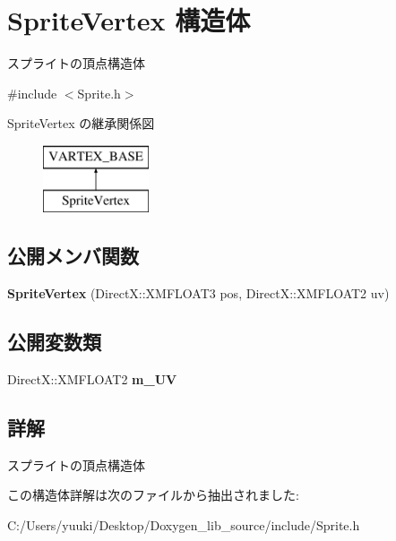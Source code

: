 \hypertarget{struct_d3_d11_1_1_graphic_1_1_sprite_vertex}{}\section{Sprite\+Vertex 構造体}
\label{struct_d3_d11_1_1_graphic_1_1_sprite_vertex}


スプライトの頂点構造体  




{\ttfamily \#include $<$Sprite.\+h$>$}

Sprite\+Vertex の継承関係図\begin{figure}[H]
\begin{center}
\leavevmode
\includegraphics[height=2.000000cm]{struct_d3_d11_1_1_graphic_1_1_sprite_vertex}
\end{center}
\end{figure}
\subsection*{公開メンバ関数}
\begin{DoxyCompactItemize}
\item 
{\bfseries Sprite\+Vertex} (Direct\+X\+::\+X\+M\+F\+L\+O\+A\+T3 pos, Direct\+X\+::\+X\+M\+F\+L\+O\+A\+T2 uv)\hypertarget{struct_d3_d11_1_1_graphic_1_1_sprite_vertex_a24107e65f29cc3aa3127346b1cd6c7e4}{}\label{struct_d3_d11_1_1_graphic_1_1_sprite_vertex_a24107e65f29cc3aa3127346b1cd6c7e4}

\end{DoxyCompactItemize}
\subsection*{公開変数類}
\begin{DoxyCompactItemize}
\item 
Direct\+X\+::\+X\+M\+F\+L\+O\+A\+T2 {\bfseries m\+\_\+\+UV}\hypertarget{struct_d3_d11_1_1_graphic_1_1_sprite_vertex_a4b3ceaf10dd4b638b7afed185e03cdff}{}\label{struct_d3_d11_1_1_graphic_1_1_sprite_vertex_a4b3ceaf10dd4b638b7afed185e03cdff}

\end{DoxyCompactItemize}


\subsection{詳解}
スプライトの頂点構造体 

この構造体詳解は次のファイルから抽出されました\+:\begin{DoxyCompactItemize}
\item 
C\+:/\+Users/yuuki/\+Desktop/\+Doxygen\+\_\+lib\+\_\+source/include/Sprite.\+h\end{DoxyCompactItemize}

